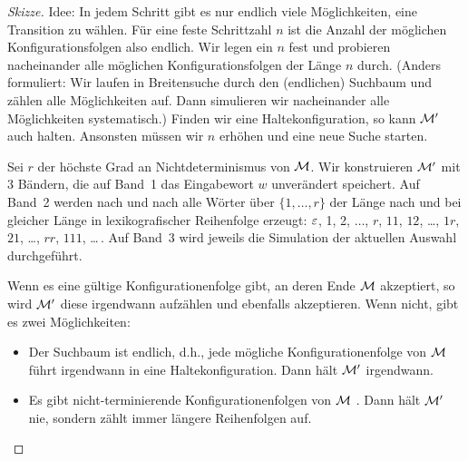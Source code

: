 \begin{proof}[Skizze]
Idee: In jedem Schritt gibt es nur endlich viele Möglichkeiten, eine Transition zu wählen.
Für eine feste Schrittzahl $n$ ist die Anzahl der möglichen Konfigurationsfolgen also endlich.
Wir legen ein $n$ fest und probieren nacheinander alle möglichen Konfigurationsfolgen der Länge $n$ durch.
(Anders formuliert: Wir laufen in Breitensuche durch den (endlichen) Suchbaum und zählen alle Möglichkeiten auf.
Dann simulieren wir nacheinander alle Möglichkeiten systematisch.)
Finden wir eine Haltekonfiguration, so kann $\mathcal{M}'$ auch halten.
Ansonsten müssen wir $n$ erhöhen und eine neue Suche starten.

Sei $r$ der höchste Grad an Nichtdeterminismus von $\mathcal{M}$.
Wir konstruieren $\mathcal{M}'$ mit 3 Bändern, die auf Band~1 das Eingabewort $w$ unverändert speichert.
Auf Band~2 werden nach und nach alle Wörter über $\{1, \dots, r\}$ der Länge nach und bei gleicher Länge in lexikografischer Reihenfolge erzeugt: $\varepsilon$, 1, 2, $\dots$, $r$, $11$, $12$, \dots, $1r$, $21$, \dots, $rr$, $111$, \dots\,.
Auf Band~3 wird jeweils die Simulation der aktuellen Auswahl durchgeführt.

Wenn es eine gültige Konfigurationenfolge gibt, an deren Ende $\mathcal{M}$ akzeptiert, so wird $\mathcal{M}'$ diese irgendwann aufzählen und ebenfalls akzeptieren.
Wenn nicht, gibt es zwei Möglichkeiten:
%
\begin{itemize}
 \item Der Suchbaum ist endlich, d.h., jede mögliche Konfigurationenfolge von $\mathcal{M}$ führt irgendwann in eine Haltekonfiguration.
 Dann hält $\mathcal{M}'$ irgendwann.
 \item Es gibt nicht-terminierende Konfigurationenfolgen von $\mathcal{M}$ .
 Dann hält $\mathcal{M}'$ nie, sondern zählt immer längere Reihenfolgen auf.
 \qedhere
\end{itemize}
\end{proof}

